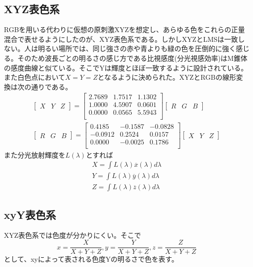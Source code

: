 		\subsection{XYZ表色系}
			RGBを用いる代わりに仮想の原刺激XYZを想定し、あらゆる色をこれらの正量混合で表せるようにしたのが、XYZ表色系である。しかしXYZとLMSは一致しない。人は明るい場所では、同じ強さの赤や青よりも緑の色を圧倒的に強く感じる。そのため波長ごとの明るさの感じ方である比視感度(分光視感効率)はM錐体の感度曲線と似ている。そこでYは輝度とほぼ一致するように設計されている。また白色点において$X = Y = Z$となるように決められた。XYZとRGBの線形変換は次の通りである。
			\begin{align*}
				\begin{bmatrix} X & Y & Z \end{bmatrix}
				=
				\begin{bmatrix}
					2.7689 & 1.7517 & 1.1302 \\
					1.0000 & 4.5907 & 0.0601 \\
					0.0000 & 0.0565 & 5.5943 \\
				\end{bmatrix}
				\begin{bmatrix} R & G & B \end{bmatrix}\\
				\begin{bmatrix} R & G & B \end{bmatrix}
				=
				\begin{bmatrix}
					0.4185 & -0.1587 & -0.0828 \\
					-0.0912 & 0.2524 & 0.0157 \\
					0.0000 & -0.0025 & 0.1786 \\
				\end{bmatrix}
				\begin{bmatrix} X & Y & Z \end{bmatrix}
			\end{align*}
			また分光放射輝度を$L(\lambda)$とすれば
			\begin{align*}
				X = \int L(\lambda)\overline{x}(\lambda)d\lambda\\
				Y = \int L(\lambda)\overline{y}(\lambda)d\lambda\\
				Z = \int L(\lambda)\overline{z}(\lambda)d\lambda
			\end{align*}
		\subsection{xyY表色系}
			XYZ表色系では色度が分かりにくい。そこで
				\[x = \frac{X}{X + Y + Z}, y = \frac{Y}{X + Y + Z}, z = \frac{Z}{X + Y + Z}\]
			として、xyによって表される色度Yの明るさで色を表す。
